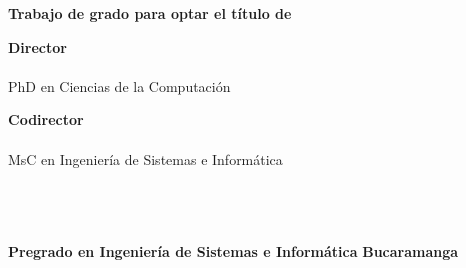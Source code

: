 \begin{titlepage}
    \begin{center}

        \textbf{\tit}

        \vspace{6em}

        \nam

        \vspace{6em}

        \textbf{Trabajo de grado para optar el título de \opta}

        \vspace{6em}

        \textbf{Director}\\
        \dir\\  PhD en Ciencias de la Computación

        \vspace{3em}
        
        \textbf{Codirector}\\
        \cdir\\ MsC en Ingeniería de Sistemas e Informática

        \vspace{4em}
        
        \textbf{\uni} \\
        \textbf{\fac} \\
        \textbf{\esc} \\
        \textbf{Pregrado en Ingeniería de Sistemas e Informática}
        \textbf{Bucaramanga} \\
        \textbf{\the\year}

    
   \end{center}
\end{titlepage}

